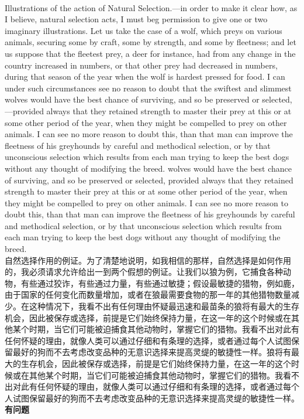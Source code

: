 \documentclass{article}
\begin{document}
\\
Illustrations of the action of Natural Selection.—in order to make it clear how, as I believe, natural selection acts, I must beg permission to give one or two imaginary illustrations. Let us take the case of a wolf, which preys on various animals, securing some by craft, some by strength, and some by fleetness; and let us suppose that the fleetest prey, a deer for instance, had from any change in the country increased in numbers, or that other prey had decreased in numbers, during that season of the year when the wolf is hardest pressed for food. I can under such circumstances see no reason to doubt that the swiftest and slimmest wolves would have the best chance of surviving, and so be preserved or selected,—provided always that they retained strength to master their prey at this or at some other period of the year, when they might be compelled to prey on other animals. I can see no more reason to doubt this, than that man can improve the fleetness of his greyhounds by careful and methodical selection, or by that unconscious selection which results from each man trying to keep the best dogs without any thought of modifying the breed. wolves would have the best chance of surviving, and so be preserved or selected, provided always that they retained strength to master their prey at this or at some other period of the year, when they might be compelled to prey on other animals. I can see no more reason to doubt this, than that man can improve the fleetness of his greyhounds by careful and methodical selection, or by that unconscious selection which results from each man trying to keep the best dogs without any thought of modifying the breed.\\
自然选择作用的例证。为了清楚地说明，如我相信的那样，自然选择是如何作用的，我必须请求允许给出一到两个假想的例证。让我们以狼为例，它捕食各种动物，有些通过狡诈，有些通过力量，有些通过敏捷；假设最敏捷的猎物，例如鹿，由于国家的任何变化而数量增加，或者在狼最需要食物的那一年的其他猎物数量减少。在这种情况下，我看不出有任何理由怀疑最迅速和最苗条的狼将有最大的生存机会，因此被保存或选择，前提是它们始终保持力量，在这一年的这个时候或在其他某个时期，当它们可能被迫捕食其他动物时，掌握它们的猎物。我看不出对此有任何怀疑的理由，就像人类可以通过仔细和有条理的选择，或者通过每个人试图保留最好的狗而不去考虑改变品种的无意识选择来提高灵缇的敏捷性一样。狼将有最大的生存机会，因此被保存或选择，前提是它们始终保持力量，在这一年的这个时候或在其他某个时期，当它们可能被迫捕食其他动物时，掌握它们的猎物。我看不出对此有任何怀疑的理由，就像人类可以通过仔细和有条理的选择，或者通过每个人试图保留最好的狗而不去考虑改变品种的无意识选择来提高灵缇的敏捷性一样。\textbf{有问题}
\end{document}

